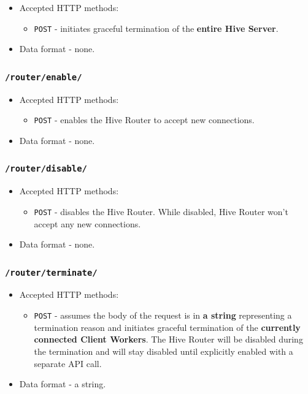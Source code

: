 \documentclass[a4paper]{article}
\begin{document}
\begin{itemize}
\item Accepted HTTP methods:
\begin{itemize}
\item \texttt{POST} - initiates graceful termination of the \textbf{entire Hive Server}.
\end{itemize}
\item Data format - none.
\end{itemize}
\subsubsection{\texttt{/router/enable/}}
\label{sec-6-1-2}


\begin{itemize}
\item Accepted HTTP methods:
\begin{itemize}
\item \texttt{POST} - enables the Hive Router to accept new connections.
\end{itemize}
\item Data format - none.
\end{itemize}
\subsubsection{\texttt{/router/disable/}}
\label{sec-6-1-3}


\begin{itemize}
\item Accepted HTTP methods:
\begin{itemize}
\item \texttt{POST} - disables the Hive Router. While disabled, Hive Router won't accept any new connections.
\end{itemize}
\item Data format - none.
\end{itemize}
\subsubsection{\texttt{/router/terminate/}}
\label{sec-6-1-4}


\begin{itemize}
\item Accepted HTTP methods:
\begin{itemize}
\item \texttt{POST} - assumes the body of the request is in \textbf{a string} representing a termination reason and initiates graceful termination of the \textbf{currently connected Client Workers}. The Hive Router will be disabled during the termination and will stay disabled until explicitly enabled with a separate API call.
\end{itemize}
\item Data format - a string.
\end{itemize}
\end{document}
